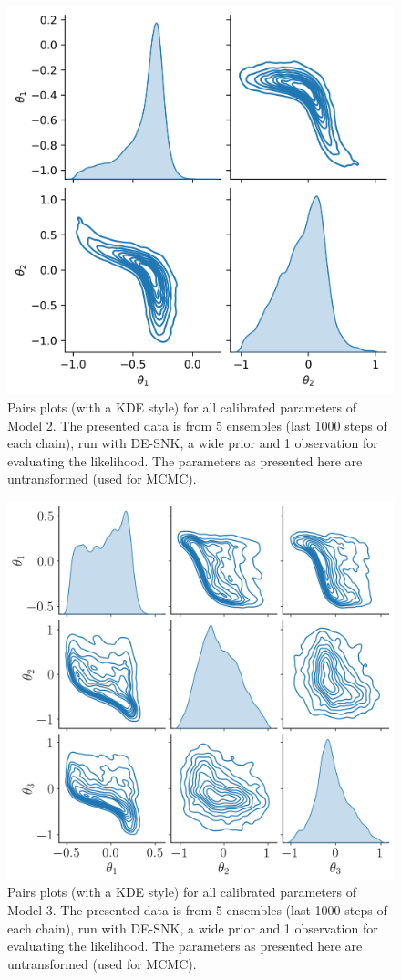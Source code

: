 \begin{figure}[htb]
\centering
\includegraphics[width=0.8\linewidth]{Figures/kde_model2_DEsnooker.png}
\caption{Pairs plots (with a KDE style) for all calibrated parameters of Model 2. The presented data is from 5 ensembles (last 1000 steps of each chain), run with DE-SNK, a wide prior and 1 observation for evaluating the likelihood. The parameters as presented here are untransformed (used for MCMC). }\label{fig_kde_model2_DEsnooker}
\end{figure}
\begin{figure}[htb]
\centering
\includegraphics[width=0.8\linewidth]{Figures/kde_model3_DEsnooker.png}
\caption{Pairs plots (with a KDE style) for all calibrated parameters of Model 3. The presented data is from 5 ensembles (last 1000 steps of each chain), run with DE-SNK, a wide prior and 1 observation for evaluating the likelihood. The parameters as presented here are untransformed (used for MCMC).}\label{fig_kde_model3_DEsnooker}
\end{figure}
